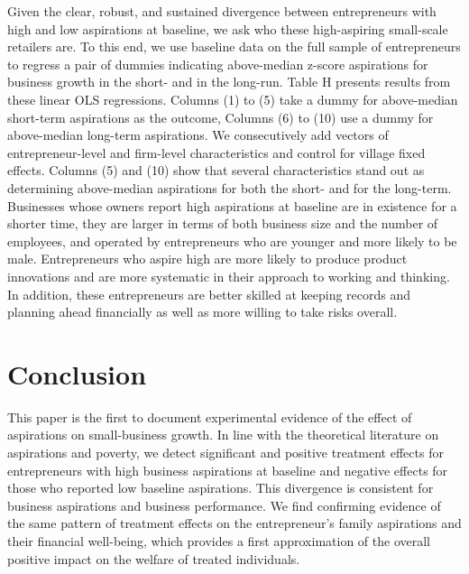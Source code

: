 \documentclass[11.5pt]{article}
\begin{document}
Given the clear, robust, and sustained divergence between entrepreneurs with high and low aspirations at baseline, we ask who these high-aspiring small-scale retailers are. To this end, we use baseline data on the full sample of entrepreneurs to regress a pair of dummies indicating above-median z-score aspirations for business growth in the short- and in the long-run. Table H presents results from these linear OLS regressions. Columns (1) to (5) take a dummy for above-median short-term aspirations as the outcome, Columns (6) to (10) use a dummy for above-median long-term aspirations. We consecutively add vectors of entrepreneur-level and firm-level characteristics and control for village fixed effects. Columns (5) and (10) show that several characteristics stand out as determining above-median aspirations for both the short- and for the long-term. Businesses whose owners report high aspirations at baseline are in existence for a shorter time, they are larger in terms of both business size and the number of employees, and operated by entrepreneurs who are younger and more likely to be male. Entrepreneurs who aspire high are more likely to produce product innovations and are more systematic in their approach to working and thinking. In addition, these entrepreneurs are better skilled at keeping records and planning ahead financially as well as more willing to take risks overall.



\section{Conclusion}\label{sec.conc}

This paper is the first to document experimental evidence of the effect of aspirations on small-business growth. In line with the theoretical literature on aspirations and poverty, we detect significant and positive treatment effects for entrepreneurs with high business aspirations at baseline and negative effects for those who reported low baseline aspirations. This divergence is consistent for business aspirations and business performance. We find confirming evidence of the same pattern of treatment effects on the entrepreneur's family aspirations and their financial well-being, which provides a first approximation of the overall positive impact on the welfare of treated individuals.
\end{document}
